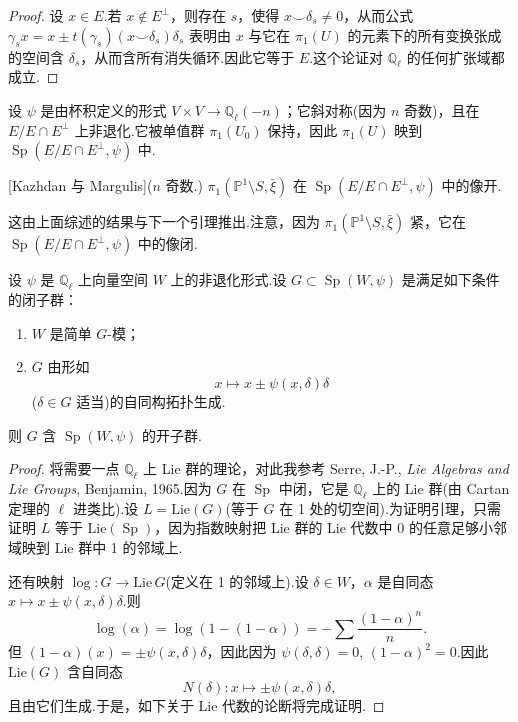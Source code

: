 \begin{proof}
设 $x \in E$.若 $x \notin E^{\perp}$，则存在 $s$，使得 $x \smile \delta_s \neq 0$，从而公式 $\gamma_s x = x \pm t(\gamma_s)(x \smile \delta_s)\delta_s$ 表明由 $x$ 与它在 $\pi_1(U)$ 的元素下的所有变换张成的空间含 $\delta_s$，从而含所有消失循环.因此它等于 $E$.这个论证对 $\mathbb{Q}_{\ell}$ 的任何扩张域都成立.
\end{proof}

\begin{remark}\label{rem:32.5}
设 $\psi$ 是由杯积定义的形式 $V \times V \to \mathbb{Q}_{\ell}(-n)$；它斜对称(因为 $n$ 奇数)，且在 $E/E \cap E^{\perp}$ 上非退化.它被单值群 $\pi_1(U_0)$ 保持，因此 $\pi_1(U)$ 映到 $\operatorname{Sp}(E/E \cap E^{\perp}, \psi)$ 中.
\end{remark}

\begin{theorem}\label{thm:32.6}[Kazhdan 与 Margulis]($n$ 奇数.) $\pi_1(\mathbb{P}^{1} \setminus S, \bar{\xi})$ 在 $\operatorname{Sp}(E/E \cap E^{\perp}, \psi)$ 中的像开.
\end{theorem}

这由上面综述的结果与下一个引理推出.注意，因为 $\pi_1(\mathbb{P}^{1} \setminus S, \bar{\xi})$ 紧，它在 $\operatorname{Sp}(E/E \cap E^{\perp}, \psi)$ 中的像闭.

\begin{lemma}\label{lem:32.7}
设 $\psi$ 是 $\mathbb{Q}_{\ell}$ 上向量空间 $W$ 上的非退化形式.设 $G \subset \operatorname{Sp}(W, \psi)$ 是满足如下条件的闭子群：
\begin{enumerate}
  \item $W$ 是简单 $G$-模；
  \item $G$ 由形如
  \[
  x \mapsto x \pm \psi(x, \delta)\delta
  \]
  ($\delta \in G$ 适当)的自同构拓扑生成.
\end{enumerate}
则 $G$ 含 $\operatorname{Sp}(W, \psi)$ 的开子群.
\end{lemma}

\begin{proof}
将需要一点 $\mathbb{Q}_{\ell}$ 上 Lie 群的理论，对此我参考 Serre, J.-P., \emph{Lie Algebras and Lie Groups}, Benjamin, 1965.因为 $G$ 在 $\operatorname{Sp}$ 中闭，它是 $\mathbb{Q}_{\ell}$ 上的 Lie 群(由 Cartan 定理的 $\ell$ 进类比).设 $L = \mathrm{Lie}(G)$(等于 $G$ 在 1 处的切空间).为证明引理，只需证明 $L$ 等于 $\mathrm{Lie}(\operatorname{Sp})$，因为指数映射把 Lie 群的 Lie 代数中 0 的任意足够小邻域映到 Lie 群中 1 的邻域上.

还有映射 $\log \colon G \to \mathrm{Lie}\, G$(定义在 1 的邻域上).设 $\delta \in W$，$\alpha$ 是自同态 $x \mapsto x \pm \psi(x, \delta)\delta$.则
\[
\log(\alpha) = \log(1 - (1 - \alpha)) = -\sum \frac{(1 - \alpha)^{n}}{n}.
\]
但 $(1 - \alpha)(x) = \pm \psi(x, \delta)\delta$，因此因为 $\psi(\delta, \delta) = 0$, $(1 - \alpha)^{2} = 0$.因此 $\mathrm{Lie}(G)$ 含自同态
\[
N(\delta) \colon x \mapsto \pm \psi(x, \delta)\delta,
\]
且由它们生成.于是，如下关于 Lie 代数的论断将完成证明.
\end{proof}

